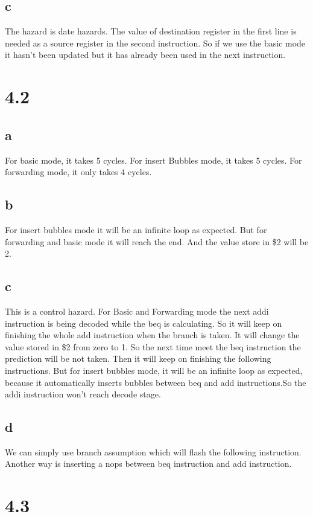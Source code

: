 \documentclass[]{article}
\begin{document}
\subsection*{c}
The hazard is date hazards. \newline
The value of destination register in the first line is needed as a source register in the second instruction. So if we use the basic mode it hasn't been updated but it has already been used in the next instruction.

\section*{4.2}
\subsection*{a}
For basic mode, it takes 5 cycles.
For insert Bubbles mode, it takes 5 cycles.
For forwarding mode, it only takes 4 cycles.
\subsection*{b}
For insert bubbles mode it will be an infinite loop as expected. But for forwarding and basic mode it will reach the end. And the value store in \$2 will be 2.
\subsection*{c}
This is a control hazard.
For Basic and Forwarding mode the next addi instruction is being decoded while the beq is calculating. So it will keep on finishing the whole add instruction when the branch is taken. It will change the value stored in \$2 from zero to 1. So the next time meet the beq instruction the prediction will be not taken. Then it will keep on finishing the following instructions. But for insert bubbles mode, it will be an infinite loop as expected, because it automatically inserts bubbles between beq and add instructions.So the addi instruction  won't reach decode stage.
\subsection*{d}
We can simply use branch assumption which will flash the following instruction.  Another way is inserting a nops between beq instruction and add instruction.\newline
\section*{4.3}
\end{document}
